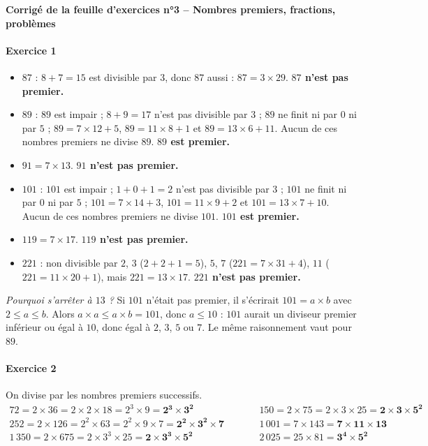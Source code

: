 \documentclass[11pt,a4paper]{article}
\newcommand{\exo}[1]{\paragraph{Exercice #1}}
\newcommand{\rep}[1]{\textbf{#1}}
\begin{document}
\begin{center}
  {\Large\bfseries Corrigé de la feuille d'exercices n°3 -- Nombres premiers, fractions, problèmes}
\end{center}

\exo{1}
\begin{itemize}
  \item $87$ : $8 + 7 = 15$ est divisible par $3$, donc $87$ aussi : $87 = 3 \times 29$. \rep{$87$ n'est pas premier.}
  \item $89$ : $89$ est impair ; $8 + 9 = 17$ n'est pas divisible par $3$ ; $89$ ne finit ni par $0$ ni par $5$ ;
  $89 = 7 \times 12 + 5$, $89 = 11 \times 8 + 1$ et $89 = 13 \times 6 + 11$.
  Aucun de ces nombres premiers ne divise $89$. \rep{$89$ est premier.}
  \item $91 = 7 \times 13$. \rep{$91$ n'est pas premier.}
  \item $101$ : $101$ est impair ; $1 + 0 + 1 = 2$ n'est pas divisible par $3$ ; $101$ ne finit ni par $0$ ni par $5$ ;
  $101 = 7 \times 14 + 3$, $101 = 11 \times 9 + 2$ et $101 = 13 \times 7 + 10$.
  Aucun de ces nombres premiers ne divise $101$. \rep{$101$ est premier.}
  \item $119 = 7 \times 17$. \rep{$119$ n'est pas premier.}
  \item $221$ : non divisible par $2$, $3$ ($2 + 2 + 1 = 5$), $5$, $7$ ($221 = 7 \times 31 + 4$), $11$ ($221 = 11 \times 20 + 1$), mais $221 = 13 \times 17$. \rep{$221$ n'est pas premier.}
\end{itemize}
\textit{Pourquoi s'arrêter à $13$ ?} Si $101$ n'était pas premier, il s'écrirait $101 = a \times b$ avec $2 \leq a \leq b$. Alors $a \times a \leq a \times b = 101$, donc $a \leq 10$ : $101$ aurait un diviseur premier inférieur ou égal à $10$, donc égal à $2$, $3$, $5$ ou $7$. Le même raisonnement vaut pour $89$.

\exo{2}
On divise par les nombres premiers successifs.
\[
\begin{array}{lll}
72 = 2 \times 36 = 2 \times 2 \times 18 = 2^3 \times 9 = \mathbf{2^3 \times 3^2} &\qquad&
150 = 2 \times 75 = 2 \times 3 \times 25 = \mathbf{2 \times 3 \times 5^2} \\[0.5em]
252 = 2 \times 126 = 2^2 \times 63 = 2^2 \times 9 \times 7 = \mathbf{2^2 \times 3^2 \times 7} &&
1\,001 = 7 \times 143 = \mathbf{7 \times 11 \times 13} \\[0.5em]
1\,350 = 2 \times 675 = 2 \times 3^3 \times 25 = \mathbf{2 \times 3^3 \times 5^2} &&
2\,025 = 25 \times 81 = \mathbf{3^4 \times 5^2}
\end{array}
\]
\end{document}
